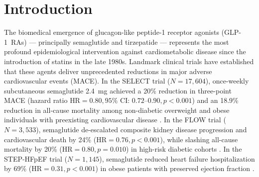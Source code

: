 \documentclass[11pt,a4paper]{article}
\begin{document}
\begin{abstract}
General equilibrium overlapping-generations actuarial modeling indicates that mass GLP-1 adoption accelerates statutory OASDI Trust Fund exhaustion by two to three years (to 2032), requiring a statutory FICA payroll tax hike of $+0.78\%$ to $+1.24\%$ (total rate $16.62\%$--$17.08\%$) and expanding the 75-year unfunded sovereign obligation by \textbf{+\$4.85 Trillion} in net present value. Finally, I identify the \textit{Generic Price-Volume Fiscal Trap}: projected 85\% drug price reductions under Medicare Inflation Reduction Act negotiations (2027) and biosimilar generic entry (2032) do not alleviate solvency pressures, but rather accelerate them by catalyzing universal volume diffusion.

\vspace{1em}
\noindent \textbf{Keywords:} GLP-1 Receptor Agonists, Cardiovascular Mortality, PAYGO Pensions, Actuarial Solvency, Frailty Horizon, Sarcopenia, Medicare and Medicaid.

\vspace{0.5em}
\noindent \textbf{JEL Classification:} I11, I13, I18, H55, J11, J14, J26.
\end{abstract}

\newpage

\section{Introduction}
\label{sec:intro}
The biomedical emergence of glucagon-like peptide-1 receptor agonists (GLP-1~RAs) --- principally semaglutide and tirzepatide --- represents the most profound epidemiological intervention against cardiometabolic disease since the introduction of statins in the late 1980s. Landmark clinical trials have established that these agents deliver unprecedented reductions in major adverse cardiovascular events (MACE). In the SELECT trial ($N = 17,604$), once-weekly subcutaneous semaglutide 2.4~mg achieved a 20\% reduction in three-point MACE (hazard ratio $\text{HR} = 0.80, 95\% \text{ CI: } 0.72$--$0.90, p < 0.001$) and an 18.9\% reduction in all-cause mortality among non-diabetic overweight and obese individuals with preexisting cardiovascular disease \citep{lincoff2023semaglutide}. In the FLOW trial ($N = 3,533$), semaglutide de-escalated composite kidney disease progression and cardiovascular death by 24\% ($\text{HR} = 0.76, p < 0.001$), while slashing all-cause mortality by 20\% ($\text{HR} = 0.80, p = 0.010$) in high-risk diabetic cohorts \citep{perkovic2024effects}. In the STEP-HFpEF trial ($N = 1,145$), semaglutide reduced heart failure hospitalization by 69\% ($\text{HR} = 0.31, p < 0.001$) in obese patients with preserved ejection fraction \citep{kosiborod2023semaglutide}.
\end{document}
